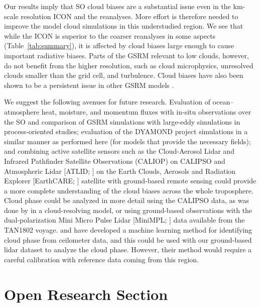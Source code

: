 \documentclass[draft]{agujournal2019}
\begin{document}
Our results imply that SO cloud biases are a substantial issue even in the km-scale resolution ICON and the reanalyses. More effort is therefore needed to improve the model cloud simulations in this understudied region. We see that while the ICON is superior to the coarser reanalyses in some aspects (Table~\ref{tab:summary}), it is affected by cloud biases large enough to cause important radiative biases. Parts of the GSRM relevant to low clouds, however, do not benefit from the higher resolution, such as cloud microphysics, unresolved clouds smaller than the grid cell, and turbulence. Cloud biases have also been shown to be a persistent issue in other GSRM models \cite{seiki2022}.

We suggest the following avenues for future research. Evaluation of ocean--atmosphere heat, moisture, and momentum fluxes with in-situ observations over the SO and comparison of GSRM simulations with large-eddy simulations in process-oriented studies; evaluation of the DYAMOND project simulations in a similar manner as performed here (for models that provide the necessary fields); and combining active satellite sensors such as the Cloud-Aerosol Lidar and Infrared Pathfinder Satellite Observations (CALIOP) on CALIPSO and Atmospheric Lidar [ATLID; ] on the Earth Clouds, Aerosols and Radiation Explorer [EarthCARE; ] satellite with ground-based remote sensing could provide a more complete understanding of the cloud biases across the whole troposphere. Cloud phase could be analyzed in more detail using the CALIPSO data, as was done by  in a cloud-resolving model, or using ground-based observations with the dual-polarization Mini Micro Pulse Lidar [MiniMPL; ] data available from the TAN1802 voyage.  and  have developed a machine learning method for identifying cloud phase from ceilometer data, and this could be used with our ground-based lidar dataset to analyze the cloud phase. However, their method would require a careful calibration with reference data coming from this region.

\section*{Open Research Section}
\end{document}
